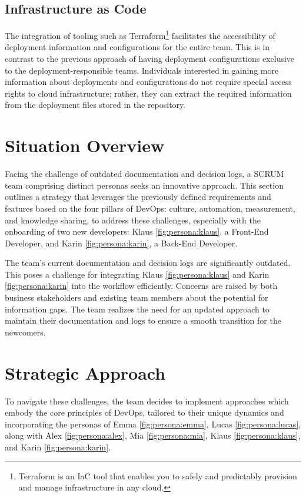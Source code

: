 \subsection*{Infrastructure as Code}
The integration of tooling such as Terraform\footnote{Terraform is an \ac{IaC} tool that enables you to safely and predictably provision and manage infrastructure in any cloud.} facilitates the accessibility of deployment information and configurations for the entire team. This is in contrast to the previous approach of having deployment configurations exclusive to the deployment-responsible teams. Individuals interested in gaining more information about deployments and configurations do not require special access rights to cloud infrastructure; rather, they can extract the required information from the deployment files stored in the repository. 

\section{Situation Overview}

Facing the challenge of outdated documentation and decision logs, a \ac{SCRUM} team comprising distinct personas seeks an innovative approach. This section outlines a strategy that leverages the previously defined requirements and features based on the four pillars of \ac{DevOps}: culture, automation, measurement, and knowledge sharing, to address these challenges, especially with the onboarding of two new developers: Klaus \ref{fig:persona:klaus}, a Front-End Developer, and Karin \ref{fig:persona:karin}, a Back-End Developer.

The team's current documentation and decision logs are significantly outdated. This poses a challenge for integrating Klaus \ref{fig:persona:klaus} and Karin \ref{fig:persona:karin} into the workflow efficiently. Concerns are raised by both business stakeholders and existing team members about the potential for information gaps. The team realizes the need for an updated approach to maintain their documentation and logs to ensure a smooth transition for the newcomers.

\section{Strategic Approach}
To navigate these challenges, the team decides to implement approaches which embody the core principles of \ac{DevOps}, tailored to their unique dynamics and incorporating the personas of Emma \ref{fig:persona:emma}, Lucas \ref{fig:persona:lucas}, along with Alex \ref{fig:persona:alex}, Mia \ref{fig:persona:mia}, Klaus \ref{fig:persona:klaus}, and Karin \ref{fig:persona:karin}.

